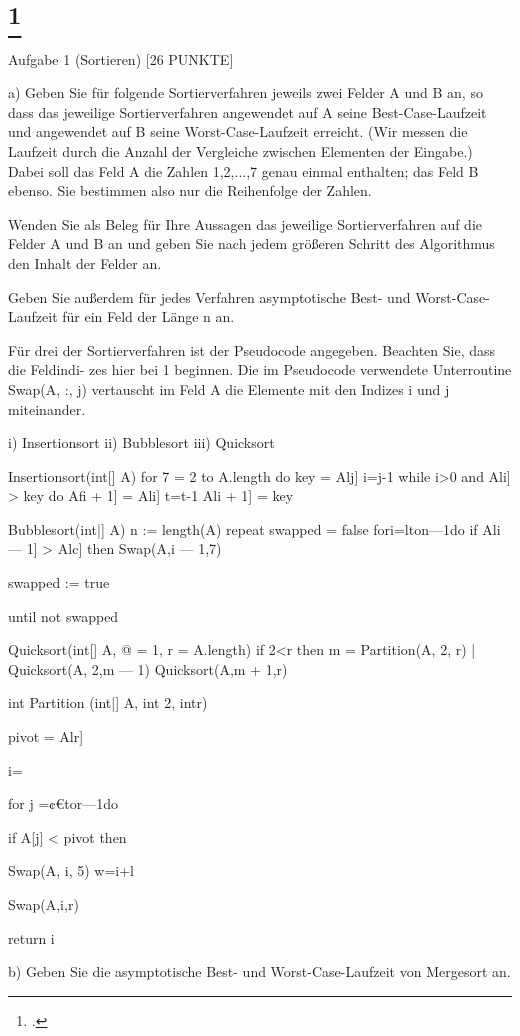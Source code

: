 \documentclass{lehramt-informatik-aufgabe}
\begin{document}

\liAufgabenTitel{}
\section{
\footcite{examen:46115:2021:03}}

Aufgabe 1 (Sortieren) [26 PUNKTE]

a) Geben Sie für folgende Sortierverfahren jeweils zwei Felder A und B an, so dass das jeweilige
Sortierverfahren angewendet auf A seine Best-Case-Laufzeit und angewendet auf B seine
Worst-Case-Laufzeit erreicht. (Wir messen die Laufzeit durch die Anzahl der Vergleiche
zwischen Elementen der Eingabe.) Dabei soll das Feld A die Zahlen 1,2,...,7 genau einmal
enthalten; das Feld B ebenso. Sie bestimmen also nur die Reihenfolge der Zahlen.

Wenden Sie als Beleg für Ihre Aussagen das jeweilige Sortierverfahren auf die Felder A und
B an und geben Sie nach jedem größeren Schritt des Algorithmus den Inhalt der Felder an.

Geben Sie außerdem für jedes Verfahren asymptotische Best- und Worst-Case-Laufzeit für
ein Feld der Länge n an.

Für drei der Sortierverfahren ist der Pseudocode angegeben. Beachten Sie, dass die Feldindi-
zes hier bei 1 beginnen. Die im Pseudocode verwendete Unterroutine Swap(A, :, j) vertauscht
im Feld A die Elemente mit den Indizes i und j miteinander.

i) Insertionsort
ii) Bubblesort
iii) Quicksort

Insertionsort(int[] A)
for 7 = 2 to A.length do
key = Alj]
i=j-1
while i>0 and Ali] > key do
Afi + 1] = Ali]
t=t-1
Ali + 1] = key

Bubblesort(int|] A)
n := length(A)
repeat
swapped = false
fori=lton—1do
if Ali — 1] > Alc] then
Swap(A,i — 1,7)

swapped := true

until not swapped

Quicksort(int[] A, @ = 1, r = A.length)
if 2<r then
m = Partition(A, 2, r)
| Quicksort(A, 2,m — 1)
Quicksort(A,m + 1,r)

int Partition (int|] A, int 2, intr)

pivot = Alr]

i=

for j =¢€tor—1do

if A[j] < pivot then

Swap(A, i, 5)
w=i+l

Swap(A,i,r)

return i

b) Geben Sie die asymptotische Best- und Worst-Case-Laufzeit von Mergesort an.
\end{document}
